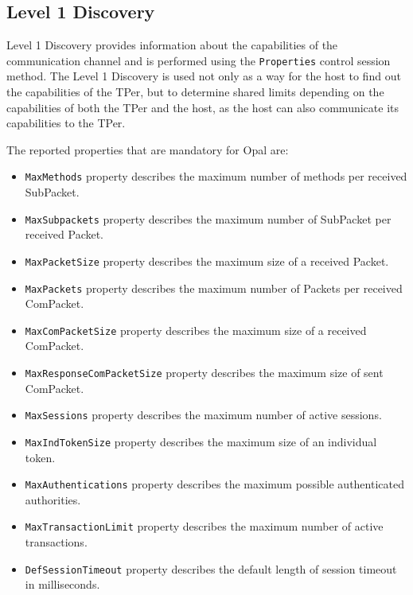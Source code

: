 \subsection{Level 1 Discovery}

Level 1 Discovery provides information about the capabilities of the communication channel and is performed using the \verb|Properties| control session method. The Level 1 Discovery is used not only as a way for the host to find out the capabilities of the TPer, but to determine shared limits depending on the capabilities of both the TPer and the host, as the host can also communicate its capabilities to the TPer.

The reported properties that are mandatory for Opal are:
\begin{itemize}
\item \verb|MaxMethods| property describes the maximum number of methods per received SubPacket.
\item \verb|MaxSubpackets| property describes the maximum number of SubPacket per received Packet.
\item \verb|MaxPacketSize| property describes the maximum size of a received Packet.
\item \verb|MaxPackets| property describes the maximum number of Packets per received ComPacket.
\item \verb|MaxComPacketSize| property describes the maximum size of a received ComPacket.
\item \verb|MaxResponseComPacketSize| property describes the maximum size of sent ComPacket.
\item \verb|MaxSessions| property describes the maximum number of active sessions.
\item \verb|MaxIndTokenSize| property describes the maximum size of an individual token.
\item \verb|MaxAuthentications| property describes the maximum possible authenticated authorities.
\item \verb|MaxTransactionLimit| property describes the maximum number of active transactions.
\item \verb|DefSessionTimeout| property describes the default length of session timeout in milliseconds.
\end{itemize}

